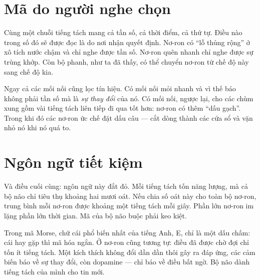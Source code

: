 
\section*{Mã do người nghe chọn}

Cùng một chuỗi tiếng tách mang cả tần số, cả thời điểm, cả thứ tự. Điều nào trong số đó sẽ được đọc là do nơi nhận quyết định. Nơ-ron có ``lỗ thủng rộng'' ở xô tích nước chậm và chỉ nghe được tần số. Nơ-ron quên nhanh chỉ nghe được sự trùng khớp. Còn bộ phanh, như ta đã thấy, có thể chuyển nơ-ron từ chế độ này sang chế độ kia.

Ngay cả các mối nối cũng lọc tín hiệu. Có mối nối mỏi nhanh và vì thế báo không phải tần số mà là \emph{sự thay đổi} của nó. Có mối nối, ngược lại, cho các chùm xung gồm vài tiếng tách liên tiếp đi qua tốt hơn: nơ-ron có thêm ``dấu gạch''. Trong khi đó các nơ-ron ức chế đặt dấu câu --- cắt dòng thành các cửa sổ và vặn nhỏ nó khi nó quá to.

\section*{Ngôn ngữ tiết kiệm}

Và điều cuối cùng: ngôn ngữ này đắt đỏ. Mỗi tiếng tách tốn năng lượng, mà cả bộ não chỉ tiêu thụ khoảng hai mươi oát. Nếu chia số oát này cho toàn bộ nơ-ron, trung bình mỗi nơ-ron được khoảng một tiếng tách mỗi giây. Phần lớn nơ-ron im lặng phần lớn thời gian. Mã của bộ não buộc phải keo kiệt.

Trong mã Morse, chữ cái phổ biến nhất của tiếng Anh, E, chỉ là một dấu chấm: cái hay gặp thì mã hóa ngắn. Ở nơ-ron cũng tương tự: điều đã được chờ đợi chỉ tốn ít tiếng tách. Một kích thích không đổi dần dần thôi gây ra đáp ứng, các cảm biến báo về sự thay đổi, còn dopamine --- chỉ báo về điều bất ngờ. Bộ não dành tiếng tách của mình cho tin mới.

